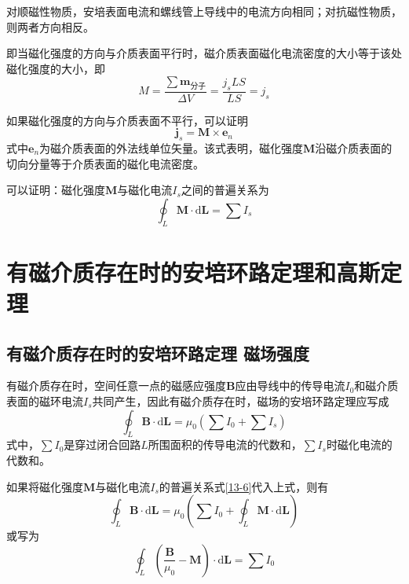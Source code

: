 \documentclass[
	12pt, %
	a4paper, %
]{myLegrandOrangeBook}
\newcommand{\rmd}{\mathrm{d}}
\begin{document}
对顺磁性物质，安培表面电流和螺线管上导线中的电流方向相同；对抗磁性物质，则两者方向相反。

即当磁化强度的方向与介质表面平行时，磁介质表面磁化电流密度的大小等于该处磁化强度的大小，即
\begin{equation}
    M = \frac{\sum  \boldsymbol{m}_{\text{分子}}}{\Delta V} = \frac{j_s L S}{L S} = j_s
\end{equation}

如果磁化强度的方向与介质表面不平行，可以证明
\begin{equation}
    \boldsymbol{j}_s = \boldsymbol{M} \times \boldsymbol{e}_n
\end{equation}
式中\(\boldsymbol{e}_n\)为磁介质表面的外法线单位矢量。该式表明，磁化强度\(\boldsymbol{M}\)沿磁介质表面的切向分量等于介质表面的磁化电流密度。

可以证明：磁化强度\(\boldsymbol{M}\)与磁化电流\(I_s\)之间的普遍关系为
\begin{equation}
    \oint_L \boldsymbol{M} \cdot \rmd \boldsymbol{L} = \sum I_s
    \label{13-6}
\end{equation}

\section{有磁介质存在时的安培环路定理和高斯定理}

\subsection{有磁介质存在时的安培环路定理 \quad 磁场强度}

\begin{theorem}[有磁介质存在时的安培环路定理]
有磁介质存在时，空间任意一点的磁感应强度\(\boldsymbol{B}\)应由导线中的传导电流\(I_0\)和磁介质表面的磁环电流\(I_s\)共同产生，因此有磁介质存在时，磁场的安培环路定理应写成
\begin{equation}
    \oint_L \boldsymbol{B} \cdot \rmd \boldsymbol{L} = \mu_0 \left(\sum I_0 + \sum I_s\right)
\end{equation}
式中，\(\sum I_0\)是穿过闭合回路\(L\)所围面积的传导电流的代数和，\(\sum I_s\)时磁化电流的代数和。
\end{theorem}

如果将磁化强度\(\boldsymbol{M}\)与磁化电流\(I_s\)的普遍关系式\ref{13-6}代入上式，则有
\begin{equation}
    \oint_L \boldsymbol{B} \cdot \rmd \boldsymbol{L} = \mu_0 \left(\sum I_0 + \oint_L \boldsymbol{M} \cdot \rmd \boldsymbol{L}\right)
\end{equation}
或写为
\begin{equation}
    \oint_L \left(\frac{\boldsymbol{B}}{\mu_0} - \boldsymbol{M}\right) \cdot \rmd \boldsymbol{L} = \sum I_0
    \label{13-9}
\end{equation}
\end{document}
